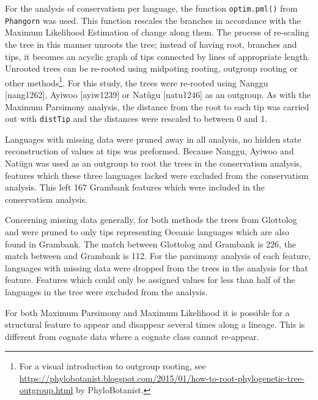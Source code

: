 \documentclass[a4paper,10pt]{article} %
\begin{document}
For the analysis of conservatism per language, the function \texttt{optim.pml()} from \texttt{Phangorn} \citep{phangorn} was used. This function rescales the branches in accordance with the Maximum Likelihood Estimation of change along them. The process of re-scaling the tree in this manner unroots the tree; instead of having root, branches and tips, it becomes an acyclic graph of tips connected by lines of appropriate length. Unrooted trees can be re-rooted using midpoting rooting, outgroup rooting or other methods\footnote{For a visual introduction to outgroup rooting, see \href{this blogpost}{https://phylobotanist.blogspot.com/2015/01/how-to-root-phylogenetic-tree-outgroup.html} by PhyloBotanist.}. For this study, the trees were re-rooted using Nanggu [nang1262], Ayiwoo [ayiw1239] or Natügu [natu1246] as an outgroup. As with the Maximum Parsimony analysis, the distance from the root to each tip was carried out with \texttt{distTip} and the distances were rescaled to between 0 and 1. 

Languages with missing data were pruned away in all analysis, no hidden state reconstruction of values at tips was preformed. Because Nanggu, Ayiwoo and Natügu was used as an outgroup to root the trees in the conservatism analysis, features which these three languages lacked were excluded from the conservatism analysis. This left 167 Grambank features which were included in the conservatism analysis. %

Concerning missing data generally, for both methods the trees from Glottolog and \citet{grayetal_2009} were pruned to only tips representing Oceanic languages which are also found in Grambank. The match between Glottolog and Grambank is 226, the match between \citet{grayetal_2009} and Grambank is 112. For the parsimony analysis of each feature, languages with missing data were dropped from the trees in the analysis for that feature. Features which could only be assigned values for less than half of the languages in the tree were excluded from the analysis.

For both Maximum Parsimony and Maximum Likelihood it is possible for a structural feature to appear and disappear several times along a lineage. This is different from cognate data where a cognate class cannot re-appear.
\end{document}

